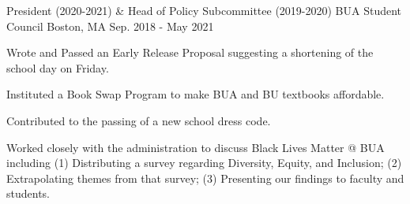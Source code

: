 

\begin{cventries}

\vspace{-1mm}
  \cventry
  {President (2020-2021) \& Head of Policy Subcommittee (2019-2020)} %
  {BUA Student Council} %
  {Boston, MA} %
  {Sep. 2018 - May 2021} %
  {
    \begin{cvitems} %
      \item {Wrote and Passed an Early Release Proposal suggesting a shortening of the school day on Friday.}
      \item {Instituted a Book Swap Program to make BUA and BU textbooks affordable.}
      \item {Contributed to the passing of a new school dress code.}
      \item {Worked closely with the administration to discuss Black Lives Matter @ BUA including (1) Distributing a survey regarding Diversity, Equity, and Inclusion; (2) Extrapolating themes from that survey; (3) Presenting our findings to faculty and students.}
    \end{cvitems}
  }

\vspace{-1mm}


\end{cventries}
